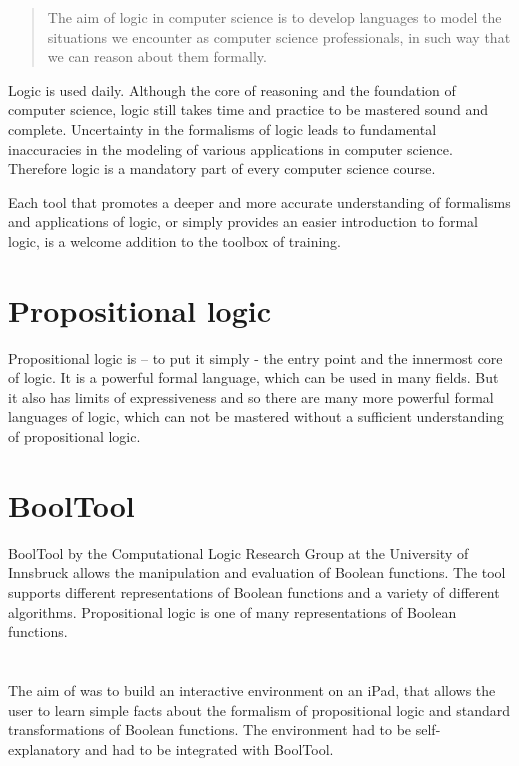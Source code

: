 
\begin{quote}
The aim of logic in computer science is to develop languages 
to model the situations we encounter as computer science professionals, 
in such way that we can reason about them formally. \cite{Huth:2004:LCS:975331}
\end{quote}

Logic is used daily. Although the core of reasoning and the foundation of computer science, 
logic still takes time and practice to be mastered sound and complete. 
Uncertainty in the formalisms of logic leads to fundamental inaccuracies 
in the modeling of various applications in computer science. 
Therefore logic is a mandatory part of every computer science course. 

Each tool that promotes a deeper and more accurate understanding of formalisms and applications of logic,
or simply provides an easier introduction to formal logic, 
is a welcome addition to the toolbox of training.

\section{Propositional logic}

Propositional logic is – to put it simply - the entry point and the innermost core of logic. 
It is a powerful formal language, which can be used in many fields. 
But it also has limits of expressiveness and so 
there are many more powerful formal languages of logic, 
which can not be mastered without a sufficient understanding  of propositional logic.

\section{BoolTool}

BoolTool by the Computational Logic Research Group at the University of Innsbruck allows the manipulation and evaluation of Boolean functions. The tool supports different representations of Boolean functions and a variety of different algorithms.
Propositional logic is one of many representations of Boolean functions.

\section{\Nyaya}

The aim of \Nyaya was to build an interactive environment on an iPad,
that allows the user to learn simple facts about the formalism of propositional logic 
and standard transformations of Boolean functions. 
The environment had to be self-explanatory and had to be integrated with BoolTool. 


%
